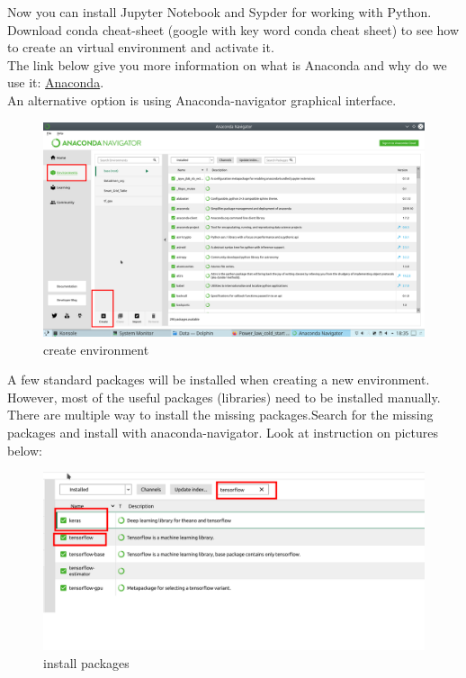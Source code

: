 \documentclass[a4paper,10pt]{article}
\begin{document}
\vspace{5mm}

Now you can install Jupyter Notebook and Sypder for working with Python.\\
Download conda cheat-sheet (google with key word conda cheat sheet) to see how to create an virtual environment and activate it.\\
The link below give you more information on what is Anaconda and why do we use it:
\href{https://protostar.space/why-you-need-python-environments-and-how-to-manage-them-with-conda}{Anaconda}.\\
An alternative option is using Anaconda-navigator graphical interface.


\begin{figure}[H]
\centering\includegraphics[width=1\columnwidth]{Pictures/env.png}
\caption[Short title]{create environment}
\label{fig:ff2}\end{figure}


A few standard packages will be installed when creating a new environment. However, most of the useful packages (libraries) need to be installed manually.\\   
There are multiple way to install the missing packages.Search for the missing packages and install with anaconda-navigator. Look at instruction on pictures below:

\vspace{5mm}
\begin{figure}[H]
\centering\includegraphics[width=1\columnwidth]{Pictures/packages.png}
\caption[Short title]{install packages}
\label{fig:ff3}\end{figure}
\end{document}
